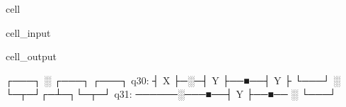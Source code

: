 \documentclass[letterpaper,10pt,english]{jupyterBook}
\begin{document}
\begin{sphinxuseclass}{cell}\begin{sphinxVerbatimInput}

\begin{sphinxuseclass}{cell_input}
\begin{sphinxVerbatim}[commandchars=\\\{\}]
  
  
\end{sphinxVerbatim}

\end{sphinxuseclass}\end{sphinxVerbatimInput}
\begin{sphinxVerbatimOutput}

\begin{sphinxuseclass}{cell_output}
\begin{sphinxVerbatim}[commandchars=\\\{\}]
      ┌───┐ ░ ┌───┐     ┌───┐
q3\PYGZus{}0: ┤ X ├─░─┤ Y ├──■──┤ Y ├
      └───┘ ░ └─┬─┘┌─┴─┐└─┬─┘
q3\PYGZus{}1: ──────░───■──┤ Y ├──■──
            ░      └───┘
\end{sphinxVerbatim}

\end{sphinxuseclass}\end{sphinxVerbatimOutput}

\end{sphinxuseclass}
\end{document}
